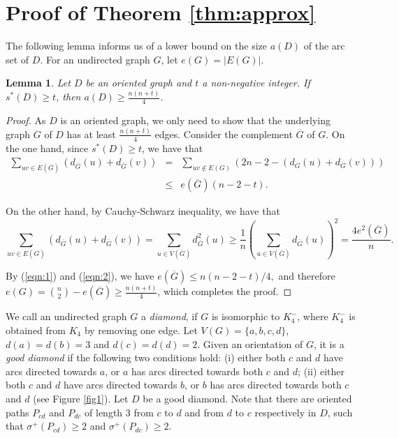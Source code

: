\documentclass[11pt]{article}
\newtheorem{lemma}[theorem]{Lemma}
\newcommand{\QGr}[1]{{#1}}
\newcommand{\2}{\vspace{0.2cm}}
\begin{document}
\section{Proof of Theorem \ref{thm:approx}}\label{sec4}

	

 The following lemma informs us of a lower bound on the size $a(D)$ of the arc set of $D$. For an undirected graph $G$, let $e(G)=|E(G)|.$
	
	\begin{lemma}\label{lem:1}
		Let $D$ be an oriented graph and $t$ a non-negative integer. If $s^*(D)\geq t$, then $a(D)\geq \frac{n(n+t)}{4}$.
	\end{lemma}
	\begin{proof}
		As $D$ is an oriented graph, we only need to show that the underlying graph $G$ of $D$ has at least $\frac{n(n+t)}{4}$ edges. Consider the complement $\overline{G}$ of $G$. On the one hand, since $s^*(D)\geq t$, we have that
		\begin{eqnarray}\label{eqn:1}
			\sum_{uv\in E(\overline{G})} (d_{\overline{G}}(u)+d_{\overline{G}}(v))&=&\sum_{uv\not\in E(G)}(2n-2-(d_{G}(u)+d_{G}(v)))\nonumber\\
&\leq& e(\overline{G})(n-2-t).
		\end{eqnarray}
		
		On the other hand, by Cauchy-Schwarz inequality, we have that
		\begin{equation}\label{eqn:2}
			\sum_{uv\in E(\overline{G})} (d_{\overline{G}}(u)+d_{\overline{G}}(v))=\sum_{u\in V(\overline{G})} d_{\overline{G}}^2(u)\geq \frac{1}{n}\left(\sum_{u\in V(\overline{G})} d_{\overline{G}}(u)\right)^2=\frac{4e^2(\overline{G})}{n}.
		\end{equation}
		
		By (\ref{eqn:1}) and (\ref{eqn:2}), we have
		\(e(\overline{G})\leq n(n-2-t)/4,\)
		and therefore $e(G)={n\choose 2}-e(\overline{G})\geq \frac{n(n+t)}{4}$, which completes the proof.
	\end{proof}


    We call an undirected graph $G$ a \emph{diamond}, if $G$ is isomorphic to $K_4^-$, where $K_4^-$ is obtained from $K_4$ by removing one edge. Let $V(G)=\{a,b,c,d\}$, $d(a)=d(b)=3$ and $d(c)=d(d)=2$. Given an orientation of $G$, it is a \emph{good diamond} if \QGr{the following two conditions hold: (i) either both $c$ and $d$ have arcs directed towards $a$, or $a$ has arcs directed towards both $c$ and $d$; (ii) either both $c$ and $d$ have arcs directed towards $b$, or $b$ has arcs directed towards both $c$ and $d$} (see Figure \ref{fig1}). Let $D$ be a good diamond. Note that there are oriented paths $P_{cd}$ and $P_{dc}$ of length 3 from $c$ to $d$ and from $d$ to $c$ respectively in $D$, such that $\sigma^+(P_{cd})\ge 2$ and $\sigma^+(P_{dc})\ge 2$.
\end{document}
